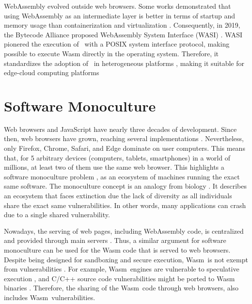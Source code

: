 {WebAssembly evolved outside web browsers.
Some works demonstrated that using WebAssembly as an intermediate layer is better in terms of startup and memory usage than containerization and virtualization \cite{pMendkiServerless, 1244493Jacobsson}. 
Consequently, in 2019, the Bytecode Alliance \cite{bytecodealliance} proposed WebAssembly System Interface (WASI) \cite{WASI}. 
WASI pionered the execution of \wasm\ with a POSIX system interface protocol, making possible to execute Wasm directly in the operating system. 
Therefore, it standardizes the adoption of \wasm\ in heterogeneous platforms \cite{bryant2020webassembly}, making it suitable for edge-cloud computing platforms \cite{9640153, wen2020wasmachine}

\section{Software Monoculture}
Web browsers and JavaScript have nearly three decades of development.
Since then, web browsers have grown, reaching several implementations \cite{grosskurth2005reference, GARCES2021111004}. 
Nevertheless, only Firefox, Chrome, Safari, and Edge dominate on user computers.
This means that, for 5 arbitrary devices (computers, tablets, smartphones) in a world of millions, at least two of them use the same web browser.
This highlights a software monoculture problem \cite{goth2003addressing}, as an ecosystem of machines running the exact same software. 
The monoculture concept is an analogy from biology \cite{lala2009monoculture}. 
It describes an ecosystem that faces extinction due the lack of diversity as all individuals share the exact same vulnerabilities.
In other words, many applications can crash due to a single shared vulnerability.


\renewcommand{\wasm}{Wasm}

Nowadays, the serving of web pages, including WebAssembly code, is centralized and provided through main servers \cite{STRAC}.
Thus, a similar argument for software monoculture can be used for the Wasm code that is served to web browsers. 
Despite being designed for sandboxing and secure execution, \wasm\ is not exempt from vulnerabilities \cite{WebAssemblySecurity}.
For example, \wasm\ engines are vulnerable to speculative execution \cite{Narayan2021Swivel}, and C/C++ source code vulnerabilities might be ported to Wasm binaries \cite{DeRoover2022}.  
Therefore, the sharing of the \wasm\ code through web browsers, also includes \wasm\ vulnerabilities.


}
